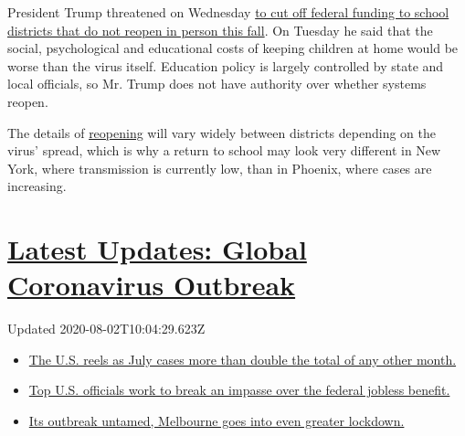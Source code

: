 President Trump threatened on Wednesday
\href{https://www.nytimes.com/2020/07/08/us/politics/trump-schools-reopening.html}{to
cut off federal funding to school districts that do not reopen in person
this fall}. On Tuesday he said that the social, psychological and
educational costs of keeping children at home would be worse than the
virus itself. Education policy is largely controlled by state and local
officials, so Mr. Trump does not have authority over whether systems
reopen.

The details of
\href{https://www.nytimes.com/2020/07/16/upshot/coronavirus-school-reopening-private-public-gap.html}{reopening}
will vary widely between districts depending on the virus' spread, which
is why a return to school may look very different in New York, where
transmission is currently low, than in Phoenix, where cases are
increasing.

\hypertarget{latest-updates-global-coronavirus-outbreak}{%
\section{\texorpdfstring{\href{https://www.nytimes.com/2020/08/01/world/coronavirus-covid-19.html?action=click\&pgtype=Article\&state=default\&region=MAIN_CONTENT_1\&context=storylines_live_updates}{Latest
Updates: Global Coronavirus
Outbreak}}{Latest Updates: Global Coronavirus Outbreak}}\label{latest-updates-global-coronavirus-outbreak}}

Updated 2020-08-02T10:04:29.623Z

\begin{itemize}
\tightlist
\item
  \href{https://www.nytimes.com/2020/08/01/world/coronavirus-covid-19.html?action=click\&pgtype=Article\&state=default\&region=MAIN_CONTENT_1\&context=storylines_live_updates\#link-34047410}{The
  U.S. reels as July cases more than double the total of any other
  month.}
\item
  \href{https://www.nytimes.com/2020/08/01/world/coronavirus-covid-19.html?action=click\&pgtype=Article\&state=default\&region=MAIN_CONTENT_1\&context=storylines_live_updates\#link-780ec966}{Top
  U.S. officials work to break an impasse over the federal jobless
  benefit.}
\item
  \href{https://www.nytimes.com/2020/08/01/world/coronavirus-covid-19.html?action=click\&pgtype=Article\&state=default\&region=MAIN_CONTENT_1\&context=storylines_live_updates\#link-2bc8948}{Its
  outbreak untamed, Melbourne goes into even greater lockdown.}
\end{itemize}

